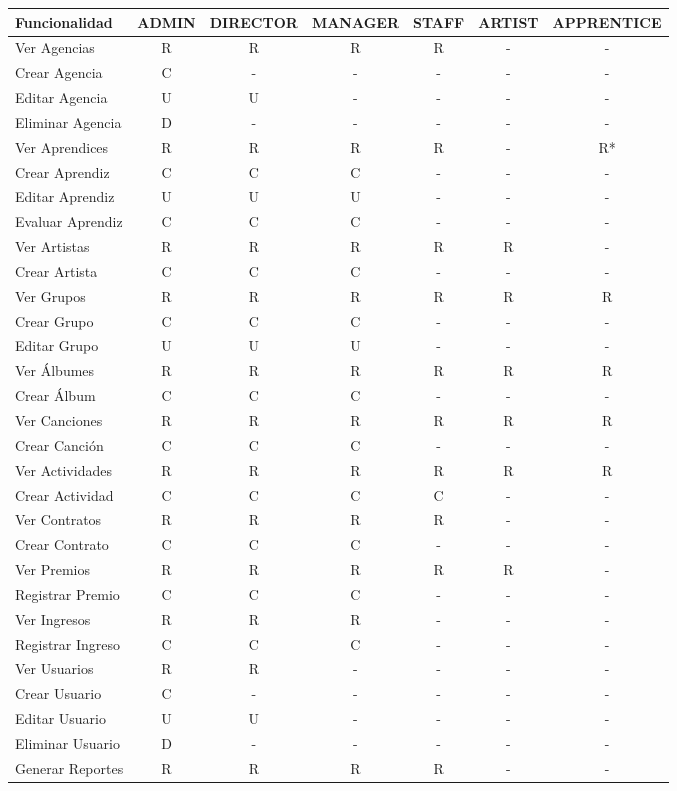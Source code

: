 \documentclass[12pt,a4paper,spanish,oneside]{report}
\begin{document}
\begin{longtable}{|l|c|c|c|c|c|c|}
\hline
\textbf{Funcionalidad} & \textbf{ADMIN} & \textbf{DIRECTOR} & \textbf{MANAGER} & \textbf{STAFF} & \textbf{ARTIST} & \textbf{APPRENTICE} \\
\hline
\endhead
\hline
\endfoot
Ver Agencias & R & R & R & R & - & - \\
\hline
Crear Agencia & C & - & - & - & - & - \\
\hline
Editar Agencia & U & U & - & - & - & - \\
\hline
Eliminar Agencia & D & - & - & - & - & - \\
\hline
Ver Aprendices & R & R & R & R & - & R* \\
\hline
Crear Aprendiz & C & C & C & - & - & - \\
\hline
Editar Aprendiz & U & U & U & - & - & - \\
\hline
Evaluar Aprendiz & C & C & C & - & - & - \\
\hline
Ver Artistas & R & R & R & R & R & - \\
\hline
Crear Artista & C & C & C & - & - & - \\
\hline
Ver Grupos & R & R & R & R & R & R \\
\hline
Crear Grupo & C & C & C & - & - & - \\
\hline
Editar Grupo & U & U & U & - & - & - \\
\hline
Ver Álbumes & R & R & R & R & R & R \\
\hline
Crear Álbum & C & C & C & - & - & - \\
\hline
Ver Canciones & R & R & R & R & R & R \\
\hline
Crear Canción & C & C & C & - & - & - \\
\hline
Ver Actividades & R & R & R & R & R & R \\
\hline
Crear Actividad & C & C & C & C & - & - \\
\hline
Ver Contratos & R & R & R & R & - & - \\
\hline
Crear Contrato & C & C & C & - & - & - \\
\hline
Ver Premios & R & R & R & R & R & - \\
\hline
Registrar Premio & C & C & C & - & - & - \\
\hline
Ver Ingresos & R & R & R & - & - & - \\
\hline
Registrar Ingreso & C & C & C & - & - & - \\
\hline
Ver Usuarios & R & R & - & - & - & - \\
\hline
Crear Usuario & C & - & - & - & - & - \\
\hline
Editar Usuario & U & U & - & - & - & - \\
\hline
Eliminar Usuario & D & - & - & - & - & - \\
\hline
Generar Reportes & R & R & R & R & - & - \\
\hline
\end{longtable}
\end{document}
